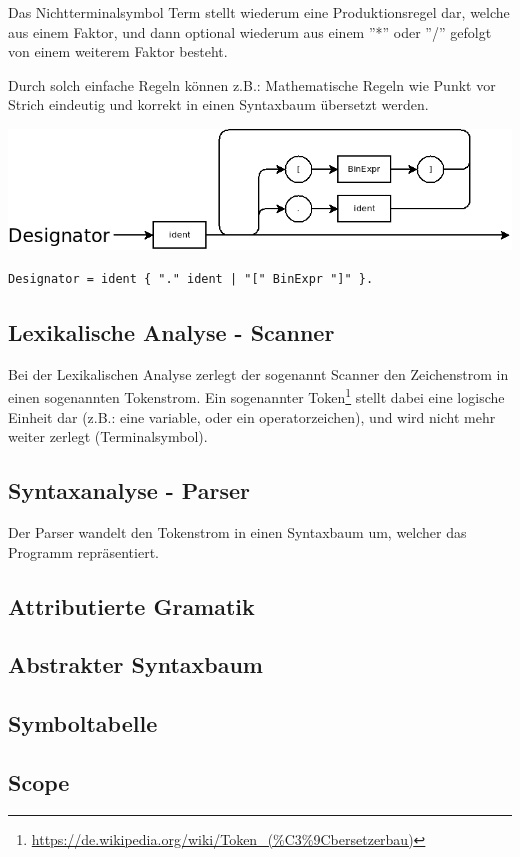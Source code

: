 Das Nichtterminalsymbol Term stellt wiederum eine Produktionsregel dar, welche aus einem Faktor, und dann optional wiederum aus einem ''*'' oder ''/'' gefolgt von einem weiterem Faktor besteht.

Durch solch einfache Regeln können z.B.: Mathematische Regeln wie Punkt vor Strich eindeutig und korrekt in einen Syntaxbaum übersetzt werden.

\includegraphics[scale=0.5]{./media/images/compiler/ebnf_designator.png}
\begin{lstlisting}[language=EBNF]
Designator = ident { "." ident | "[" BinExpr "]" }.
\end{lstlisting}



\subsection{Lexikalische Analyse - Scanner}

Bei der Lexikalischen Analyse zerlegt der sogenannt Scanner den Zeichenstrom in einen sogenannten Tokenstrom. Ein sogenannter Token\footnote{\url{https://de.wikipedia.org/wiki/Token_(\%C3\%9Cbersetzerbau)}} stellt dabei eine logische Einheit dar (z.B.: eine variable, oder ein operatorzeichen), und wird nicht mehr weiter zerlegt (Terminalsymbol).

\subsection{Syntaxanalyse - Parser}

Der Parser wandelt den Tokenstrom in einen Syntaxbaum um, welcher das Programm repräsentiert.

\subsection{Attributierte Gramatik}

\subsection{Abstrakter Syntaxbaum}

\subsection{Symboltabelle}

\subsection{Scope}